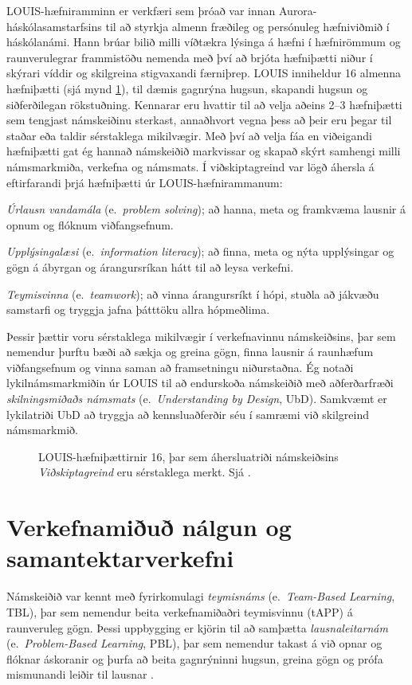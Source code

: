 \documentclass{article}
\begin{document}
LOUIS-hæfniramminn \citep{auroraLOUIS} er verkfæri sem þróað var innan Aurora-háskólasamstarfsins til að styrkja almenn fræðileg og persónuleg hæfniviðmið í háskólanámi. Hann brúar bilið milli víðtækra lýsinga á hæfni í hæfnirömmum og raunverulegrar frammistöðu nemenda með því að brjóta hæfniþætti niður í skýrari víddir og skilgreina stigvaxandi færniþrep. LOUIS inniheldur 16 almenna hæfniþætti (sjá mynd \ref{fig:louis-grid}), til dæmis gagnrýna hugsun, skapandi hugsun og siðferðilegan rökstuðning. Kennarar eru hvattir til að velja aðeins 2--3 hæfniþætti sem tengjast námskeiðinu sterkast, annaðhvort vegna þess að þeir eru þegar til staðar eða taldir sérstaklega mikilvægir. Með því að velja fáa en viðeigandi hæfniþætti gat ég hannað námskeiðið markvissar og skapað skýrt samhengi milli námsmarkmiða, verkefna og námsmats.
Í viðskiptagreind var lögð áhersla á eftirfarandi þrjá hæfniþætti úr LOUIS-hæfnirammanum:
\begin{enumerate*}
\item \emph{Úrlausn vandamála} (e.~\emph{problem solving}); að hanna, meta og framkvæma lausnir á opnum og flóknum viðfangsefnum.
\item \emph{Upplýsingalæsi} (e.~\emph{information literacy}); að finna, meta og nýta upplýsingar og gögn á ábyrgan og árangursríkan hátt til að leysa verkefni.
\item \emph{Teymisvinna} (e.~\emph{teamwork}); að vinna árangursríkt í hópi, stuðla að jákvæðu samstarfi og tryggja jafna þátttöku allra hópmeðlima.
\end{enumerate*}
Þessir þættir voru sérstaklega mikilvægir í verkefnavinnu námskeiðsins, þar sem nemendur þurftu bæði að sækja og greina gögn, finna lausnir á raunhæfum viðfangsefnum og vinna saman að framsetningu niðurstaðna.
Ég notaði lykilnámsmarkmiðin úr LOUIS til að endurskoða námskeiðið með aðferðarfræði \emph{skilningsmiðaðs námsmats} (e.~\emph{Understanding by Design}, UbD). Samkvæmt \cite{wiggins2005understanding} er lykilatriði UbD að tryggja að kennsluaðferðir séu í samræmi við skilgreind námsmarkmið.
\begin{figure}[ht]
\centering

\caption{LOUIS-hæfniþættirnir 16, þar sem áhersluatriði námskeiðsins \emph{Viðskiptagreind} eru sérstaklega merkt. Sjá \cite{auroraLOUIS}.}
\label{fig:louis-grid}
\end{figure}

\section*{Verkefnamiðuð nálgun og samantektarverkefni}
Námskeiðið var kennt með fyrirkomulagi \textit{teymisnáms} (e.~\textit{Team-Based Learning}, TBL), þar sem nemendur beita verkefnamiðaðri teymisvinnu (tAPP) á raunveruleg gögn. Þessi uppbygging er kjörin til að samþætta \textit{lausnaleitarnám} (e.~\textit{Problem-Based Learning}, PBL), þar sem nemendur takast á við opnar og flóknar áskoranir og þurfa að beita gagnrýninni hugsun, greina gögn og prófa mismunandi leiðir til lausnar \citep{barrows1980problem}.
\end{document}
